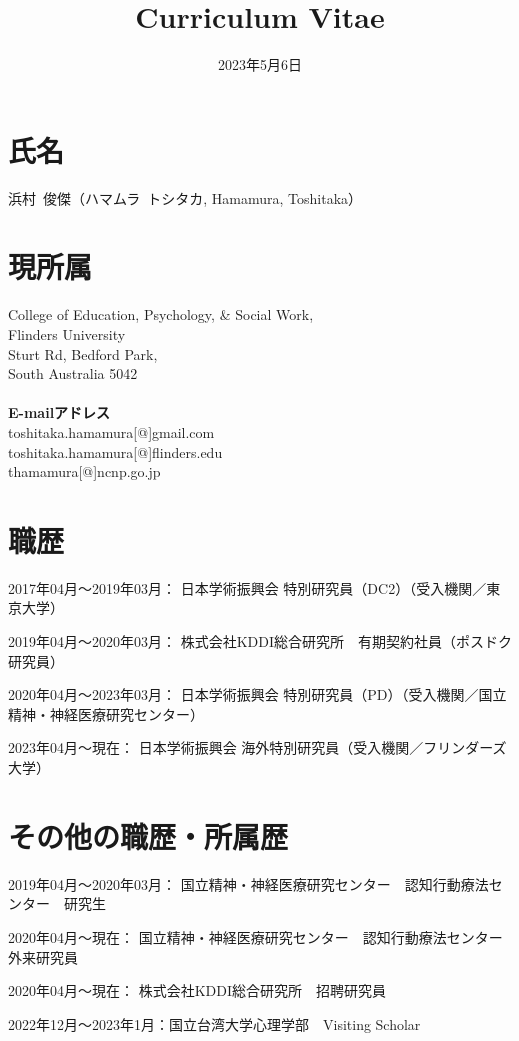 \documentclass[11pt,a4paper]{article}
\begin{document}
\title{Curriculum Vitae}
\date{2023年5月6日}
\maketitle

\noindent
\section{氏名}
浜村\ 俊傑（ハマムラ\ トシタカ, Hamamura, Toshitaka）
\section{現所属}
College of Education, Psychology, \& Social Work,\\
Flinders University\\
Sturt Rd, Bedford Park,\\
South Australia 5042\\~\\
\textbf{E-mailアドレス}\\
toshitaka.hamamura[@]gmail.com\\
toshitaka.hamamura[@]flinders.edu\\
thamamura[@]ncnp.go.jp\\

\section{職歴}
\begin{description}
	\item 2017年04月～2019年03月： 日本学術振興会 特別研究員（DC2）（受入機関／東京大学）
	\item 2019年04月～2020年03月： 株式会社KDDI総合研究所　有期契約社員（ポスドク研究員）
	\item 2020年04月～2023年03月： 日本学術振興会 特別研究員（PD）（受入機関／国立精神・神経医療研究センター）
	\item 2023年04月～現在： 日本学術振興会 海外特別研究員（受入機関／フリンダーズ大学）
\end{description}

\section{その他の職歴・所属歴}
\begin{description}
	\item 2019年04月～2020年03月： 国立精神・神経医療研究センター　認知行動療法センター　研究生
	\item 2020年04月～現在： 国立精神・神経医療研究センター　認知行動療法センター　外来研究員
	\item 2020年04月～現在： 株式会社KDDI総合研究所　招聘研究員
	\item 2022年12月～2023年1月：国立台湾大学心理学部　Visiting Scholar
\end{description}
\end{document}
